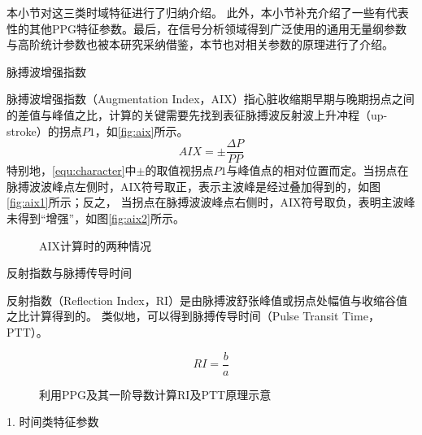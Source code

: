 本小节对这三类时域特征进行了归纳介绍。
此外，本小节补充介绍了一些有代表性的其他PPG特征参数。最后，在信号分析领域得到广泛使用的通用无量纲参数与高阶统计参数也被本研究采纳借鉴，本节也对相关参数的原理进行了介绍。

脉搏波增强指数

脉搏波增强指数（Augmentation Index，AIX）指心脏收缩期早期与晚期拐点之间的差值与峰值之比，计算的关键需要先找到表征脉搏波反射波上升冲程（up-stroke）的拐点$P1$，如\autoref{fig:aix}所示\cite{Su2014}。
\begin{equation}
    \label{equ:aix}
    AIX = \pm \frac{\Delta P}{PP}
\end{equation}
特别地，\autoref{equ:character}中$\pm$的取值视拐点$P1$与峰值点的相对位置而定。当拐点在脉搏波波峰点左侧时，AIX符号取正，表示主波峰是经过叠加得到的，如图\autoref{fig:aix1}所示；反之，
当拐点在脉搏波波峰点右侧时，AIX符号取负，表明主波峰未得到“增强”，如图\autoref{fig:aix2}所示。

\begin{figure}[htbp]
    \centering
    \quad
    \caption[AIX计算时的两种情况]{\label{fig:aix}AIX计算时的两种情况\cite{Su2014}}
\end{figure}

反射指数与脉搏传导时间

反射指数（Reflection Index，RI）是由脉搏波舒张峰值或拐点处幅值与收缩谷值之比计算得到的\cite{Su2014,Elgendi2012}。
类似地，可以得到脉搏传导时间（Pulse Transit Time，PTT）\cite{Brumfield2005,Su2014}。

\begin{equation}
    \label{equ:ri}
    RI = \frac{b}{a}
\end{equation}

\begin{figure}[htbp]
    \centering
    \quad
    \caption[利用PPG及其一阶导数计算RI及PTT原理示意]{\label{fig:aix}利用PPG及其一阶导数计算RI及PTT原理示意\cite{Su2014}}
\end{figure}

1. 时间类特征参数

